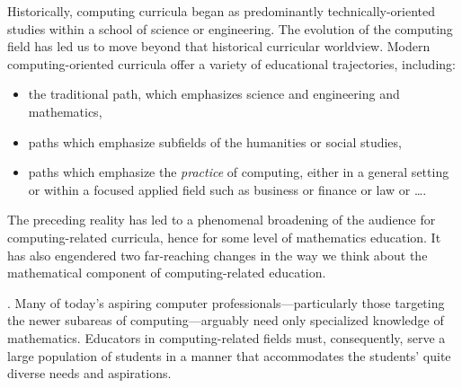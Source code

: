 Historically, computing curricula began as predominantly technically-oriented studies within a school of science or engineering.  The evolution of the computing field has led us to move beyond that historical curricular worldview.  Modern computing-oriented curricula offer a variety of educational trajectories, including:
\begin{itemize}
\item
the traditional path, which emphasizes science and engineering and mathematics,
\item
paths which emphasize subfields of the humanities or social studies,
\item
paths which emphasize the {\em practice} of computing, either in a general setting or within a focused applied field such as business or finance or law or \ldots.
\end{itemize}
The preceding reality has led to a phenomenal broadening of the audience for computing-related curricula, hence for some level of mathematics education.  It has also engendered two far-reaching changes in the way we think about the mathematical component of computing-related education.

\medskip

.
Many of today's aspiring computer professionals---particularly those targeting the newer subareas of computing---arguably need only specialized knowledge of mathematics.  Educators in computing-related fields must, consequently, serve a large population of students in a manner that accommodates the students' quite diverse needs and aspirations.

\medskip

